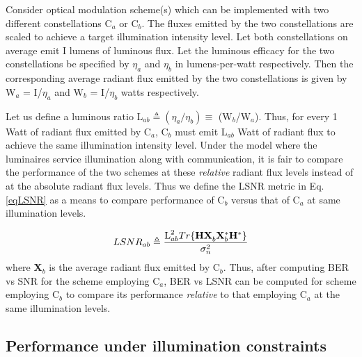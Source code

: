 \documentclass[10pt,letterpaper]{article}
\newcommand{\vm}[1]{{\bf{#1}}}
\begin{document}
Consider optical modulation scheme(s) which can be implemented with two different constellations C$_a$ or C$_b$. The fluxes emitted by the two constellations are scaled to achieve a target illumination intensity level. Let both constellations on average emit I lumens of luminous flux. Let the luminous efficacy for the two constellations be specified by $\eta_a$ and $\eta_b$ in lumens-per-watt respectively. Then the corresponding average radiant flux emitted by the two constellations is given by W$_a$ = I/$\eta_a$ and W$_b$  = I/$\eta_b$ watts respectively. 

Let us define a luminous ratio L$_{ab}\triangleq (\eta_a/\eta_b) \equiv$ (W$_b$/W$_a$). Thus, for every 1 Watt of radiant flux emitted by C$_a$, C$_b$ must emit L$_{ab}$ Watt of radiant flux to achieve the same illumination intensity level. Under the model where the luminaires service illumination along with communication, it is fair to compare the performance of the two schemes at these \textit{relative} radiant flux levels instead of at the absolute radiant flux levels. Thus we define the LSNR metric in Eq.\eqref{eqLSNR} as a means to compare performance of C$_b$ versus that of C$_a$ at same illumination levels. 

\begin{equation}
	LSNR_{ab} \triangleq \frac{\text{L}^{2}_{ab}Tr\{\vm{H}\vm{X}^{ }_{b}\vm{X}^{*}_{b}\vm{H}^{*}\}}{\sigma^{2}_{n}} 
	\label{eqLSNR}
\end{equation}
where \vm{X}$_{b}$ is the average radiant flux emitted by C$_b$. Thus, after computing BER vs SNR for the scheme employing C$_a$, BER vs LSNR can be computed for scheme employing C$_b$ to compare its performance \textit{relative} to that employing C$_a$ at the same illumination levels.

\subsection{Performance under illumination constraints}\label{ssCSKLSNR}
\end{document}
